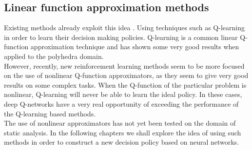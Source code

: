 \subsection{Linear function approximation methods}
Existing methods already exploit this idea \cite{singh2018fast}. Using techniques such as Q-learning in order to learn their decision making policies. Q-learning is a common linear Q-function approximation technique and has shown some very good results when applied to the polyhedra domain.\\
However, recently, new reinforcement learning methods seem to be more focused on the use of nonlinear Q-function approximators, as they seem to give very good results on some  complex tasks. When the Q-function of the particular problem is nonlinear, Q-learning will never be able to learn the ideal policy. In these cases, deep Q-networks have a very real opportunity of exceeding the performance of the Q-learning based methods.\\
The use of nonlinear approximators has not yet been tested on the domain of static analysis. In the following chapters we shall explore the idea of using such methods in order to construct a new decision policy based on neural networks.
















